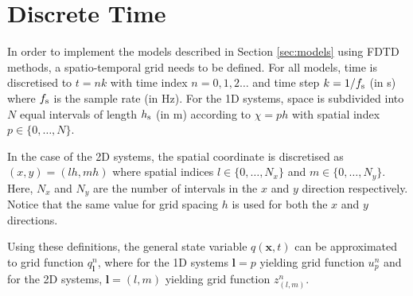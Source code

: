 \documentclass{article}
\begin{document}
\section{Discrete Time}\label{sec:discrete}
In order to implement the models described in Section \ref{sec:models} using FDTD methods, a spatio-temporal grid needs to be defined.
%
%
%
For all models, time is discretised to $t = nk$ with time index $n = 0, 1, 2 \hdots$ and time step $k = 1/f_\text{s}$ (in s) where $f_\text{s}$ is the sample rate (in Hz). For the 1D systems, space is subdivided into $N$ equal intervals of length $h_{\text{s}}$ (in m) according to $\chi = p h$ with spatial index $p \in \{0, \hdots, N\}$. 

In the case of the 2D systems, the spatial coordinate is discretised as $(x, y) = (l h, m h)$ where spatial indices $l \in \{0, \hdots, N_x\}$ and $m\in\{0, \hdots, N_y\}$. Here, $N_x$ and $N_y$ are the number of intervals in the $x$ and $y$ direction respectively. Notice that the same value for grid spacing $h$ is used for both the $x$ and $y$ directions. 

Using these definitions, the general state variable $q(\boldsymbol{x}, t)$ can be approximated to grid function $q_{\boldsymbol{l}}^n$, where for the 1D systems $\boldsymbol{l} = p$ yielding grid function $u_p^n$ and for the 2D systems, $\boldsymbol{l} = (l, m)$ yielding grid function $z_{(l,m)}^n$.
\end{document}
